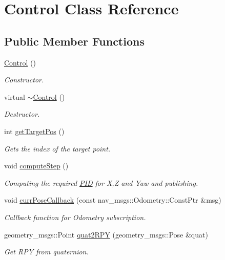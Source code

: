 \hypertarget{class_control}{}\section{Control Class Reference}
\label{class_control}
\subsection*{Public Member Functions}
\begin{DoxyCompactItemize}
\item 
\hyperlink{class_control_aa730aeda4517f40bc48ba1e46ebded77}{Control} ()
\begin{DoxyCompactList}\small\item\em Constructor. \end{DoxyCompactList}\item 
virtual \hyperlink{class_control_aedda1328c4f8b8d49bca8f0812d3bfd1}{$\sim$\+Control} ()
\begin{DoxyCompactList}\small\item\em Destructor. \end{DoxyCompactList}\item 
int \hyperlink{class_control_a3e1786f3e1fb35fd812711a8b2d0a81e}{get\+Target\+Pos} ()
\begin{DoxyCompactList}\small\item\em Gets the index of the target point. \end{DoxyCompactList}\item 
void \hyperlink{class_control_a7cb8e5afce664ae98bc50e5316bd6a83}{compute\+Step} ()
\begin{DoxyCompactList}\small\item\em Computing the required \hyperlink{class_p_i_d}{P\+ID} for X,Z and Yaw and publishing. \end{DoxyCompactList}\item 
void \hyperlink{class_control_af1588f8eee22c58006d23bfedc415db8}{curr\+Pose\+Callback} (const nav\+\_\+msgs\+::\+Odometry\+::\+Const\+Ptr \&msg)
\begin{DoxyCompactList}\small\item\em Callback function for Odometry subscription. \end{DoxyCompactList}\item 
geometry\+\_\+msgs\+::\+Point \hyperlink{class_control_acfe571f3f78226cd447334d6a7616215}{quat2\+R\+PY} (geometry\+\_\+msgs\+::\+Pose \&quat)
\begin{DoxyCompactList}\small\item\em Get R\+PY from quaternion. \end{DoxyCompactList}\end{DoxyCompactItemize}


